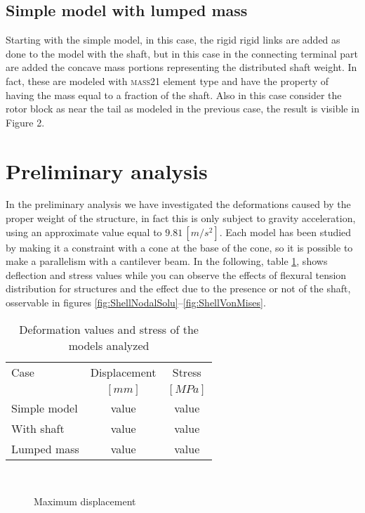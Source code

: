 \subsection{Simple model with lumped mass}
Starting with the simple model, in this case, the rigid rigid links are added as done to the model with the shaft, but in this case in the connecting terminal part are added the concave mass portions representing the distributed shaft weight. In fact, these are modeled with \textsc{mass21} element type and have the property of having the mass equal to a fraction of the shaft.
Also in this case consider the rotor block as near the tail as modeled in the previous case, the result is visible in Figure 2.

\section{Preliminary analysis}
In the preliminary analysis we have investigated the deformations caused by the proper weight of the structure, in fact this is only subject to gravity acceleration, using an approximate value equal to $9.81\,[m/s^2]$.
Each model has been studied by making it a constraint with a cone at the base of the cone, so it is possible to make a parallelism with a cantilever beam.
In the following, table \ref{tab:RecapStressDeformation}, shows deflection and stress values while you can observe the effects of flexural tension distribution for structures and the effect due to the presence or not of the shaft, osservable in figures \ref{fig:ShellNodalSolu}--\ref{fig:ShellVonMises}.
\begin{table}[!ht]
\centering
\begin{tabular}{lcc}
\hline
Case				& Displacement 	& 	Stress\\
				& $[mm]$			&	$[MPa]$\\
\hline
Simple model		& value 			& 	value\\
With shaft		& value 			& 	value\\
Lumped mass		& value 			& 	value\\
\hline
\end{tabular}
\caption{Deformation values and stress of the models analyzed}
\label{tab:RecapStressDeformation}
\end{table}
\begin{figure}[ht]
\centering
{} \quad
{} \\
   \caption{Maximum displacement}
   \label{fig:ShellDisplacement}
\end{figure}


